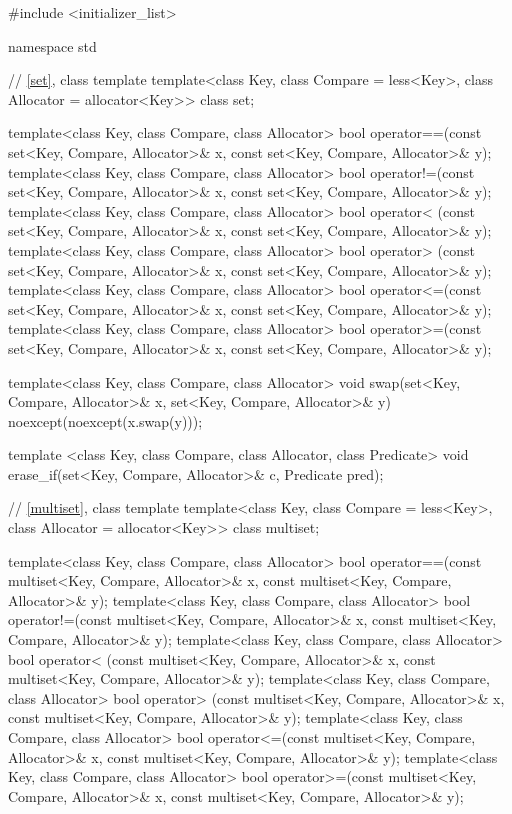 \begin{codeblock}
#include <initializer_list>

namespace std {
  // \ref{set}, class template 
  template<class Key, class Compare = less<Key>, class Allocator = allocator<Key>>
    class set;

  template<class Key, class Compare, class Allocator>
    bool operator==(const set<Key, Compare, Allocator>& x,
                    const set<Key, Compare, Allocator>& y);
  template<class Key, class Compare, class Allocator>
    bool operator!=(const set<Key, Compare, Allocator>& x,
                    const set<Key, Compare, Allocator>& y);
  template<class Key, class Compare, class Allocator>
    bool operator< (const set<Key, Compare, Allocator>& x,
                    const set<Key, Compare, Allocator>& y);
  template<class Key, class Compare, class Allocator>
    bool operator> (const set<Key, Compare, Allocator>& x,
                    const set<Key, Compare, Allocator>& y);
  template<class Key, class Compare, class Allocator>
    bool operator<=(const set<Key, Compare, Allocator>& x,
                    const set<Key, Compare, Allocator>& y);
  template<class Key, class Compare, class Allocator>
    bool operator>=(const set<Key, Compare, Allocator>& x,
                    const set<Key, Compare, Allocator>& y);

  template<class Key, class Compare, class Allocator>
    void swap(set<Key, Compare, Allocator>& x,
              set<Key, Compare, Allocator>& y)
      noexcept(noexcept(x.swap(y)));

  template <class Key, class Compare, class Allocator, class Predicate>
    void erase_if(set<Key, Compare, Allocator>& c, Predicate pred);

  // \ref{multiset}, class template 
  template<class Key, class Compare = less<Key>, class Allocator = allocator<Key>>
    class multiset;

  template<class Key, class Compare, class Allocator>
    bool operator==(const multiset<Key, Compare, Allocator>& x,
                    const multiset<Key, Compare, Allocator>& y);
  template<class Key, class Compare, class Allocator>
    bool operator!=(const multiset<Key, Compare, Allocator>& x,
                    const multiset<Key, Compare, Allocator>& y);
  template<class Key, class Compare, class Allocator>
    bool operator< (const multiset<Key, Compare, Allocator>& x,
                    const multiset<Key, Compare, Allocator>& y);
  template<class Key, class Compare, class Allocator>
    bool operator> (const multiset<Key, Compare, Allocator>& x,
                    const multiset<Key, Compare, Allocator>& y);
  template<class Key, class Compare, class Allocator>
    bool operator<=(const multiset<Key, Compare, Allocator>& x,
                    const multiset<Key, Compare, Allocator>& y);
  template<class Key, class Compare, class Allocator>
    bool operator>=(const multiset<Key, Compare, Allocator>& x,
                    const multiset<Key, Compare, Allocator>& y);

}
\end{codeblock}
